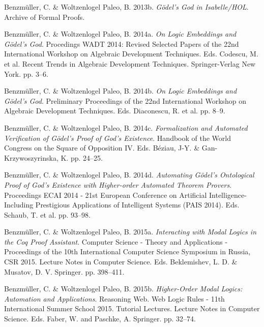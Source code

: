 \documentclass[smallextended]{svjour3}
\begin{document}
\begin{thebibliography}{9}
Benzm\"uller, C. \& Woltzenlogel Paleo, B. 2013b. {\itshape G{\"{o}}del's God in Isabelle/HOL}. Archive of Formal Proofs. 

Benzm\"uller, C. \& Woltzenlogel Paleo, B. 2014a. {\itshape On Logic Embeddings and G\"odel's God}. Procedings WADT 2014: Revised Selected Papers of the 22nd International Workshop on Algebraic Development Techniques. Eds. Codescu, M. et al. Recent Trends in Algebraic Development Techniques. Springer-Verlag New York. pp. 3--6. 

Benzm\"uller, C. \& Woltzenlogel Paleo, B. 2014b. {\itshape On Logic Embeddings and G\"odel's God}. Preliminary Proceedings of the 22nd International Workshop on Algebraic Development Techniques. Eds. Diaconescu, R. et al. pp. 8--9. 


Benzm\"uller, C. \& Woltzenlogel Paleo, B. 2014c. {\itshape Formalization and Automated Verification of G\"odel's Proof of God's Existence}. Handbook of the World Congress on the Square of Opposition IV. Eds. B\'{e}ziau, J-Y. \& Gan-Krzywoszyrinska, K. pp. 24--25. 

Benzm\"uller, C. \& Woltzenlogel Paleo, B. 2014d. {\itshape Automating G{\"{o}}del's Ontological Proof of God's Existence with Higher-order Automated Theorem Provers}. Proceedings ECAI 2014 - 21st European Conference on Artificial Intelligence- Including Prestigious Applications of Intelligent Systems (PAIS 2014). Eds. Schaub, T. et al. pp. 93--98. 

Benzm\"uller, C. \& Woltzenlogel Paleo, B. 2015a. {\itshape Interacting with Modal Logics in the Coq Proof Assistant}. Computer Science - Theory and Applications - Proceedings of the 10th International Computer Science Symposium in Russia, {CSR} 2015. Lecture Notes in Computer Science. Eds. Beklemishev, L. D. \& Musatov, D. V. Springer. pp. 398--411. 

Benzm\"uller, C. \& Woltzenlogel Paleo, B. 2015b. {\itshape Higher-Order Modal Logics: Automation and Applications}. Reasoning Web. Web Logic Rules - 11th International Summer School 2015. Tutorial Lectures. Lecture Notes in Computer Science. Eds. Faber, W. and Paschke, A. Springer. pp. 32--74. 


\end{thebibliography}
\end{document}
